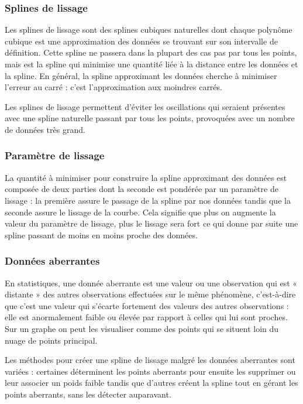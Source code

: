 \documentclass[a4paper,12pt]{article} %
\begin{document}
\subsubsection*{Splines de lissage}
Les splines de lissage sont des splines cubiques naturelles dont chaque polynôme cubique est une approximation des données se trouvant sur son intervalle de définition. Cette spline ne passera dans la plupart des cas pas par tous les points, mais est la spline qui minimise une quantité liée à la distance entre les données et la spline. En général, la spline approximant les données cherche à minimiser l'erreur au carré : c'est l'approximation aux moindres carrés. 

Les splines de lissage permettent d'éviter les oscillations qui seraient présentes avec une spline naturelle passant par tous les points, provoquées avec un nombre de données très grand.

\subsubsection*{Paramètre de lissage}
La quantité à minimiser pour construire la spline approximant des données est composée de deux parties dont la seconde est pondérée par un paramètre de lissage : la première assure le passage de la spline par nos données tandis que la seconde assure le lissage de la courbe. Cela signifie que plus on augmente la valeur du paramètre de lissage, plus le lissage sera fort ce qui donne par suite une spline passant de moins en moins proche des données.

\subsubsection*{Données aberrantes}

En statistiques, une donnée aberrante est une valeur ou une observation qui est « distante » des autres observations effectuées sur le même phénomène, c'est-à-dire que c’est une valeur qui s'écarte fortement des valeurs des autres observations : elle est anormalement faible ou élevée par rapport à celles qui lui sont proches. Sur un graphe on peut les visualiser comme des points qui se situent loin du nuage de points principal.

Les  méthodes pour créer une spline de lissage malgré les données aberrantes sont variées : certaines déterminent les points aberrants pour ensuite les supprimer ou leur associer un poids faible tandis que d'autres créent la spline tout en gérant les points aberrants, sans les détecter auparavant. 
\newpage
\end{document}
